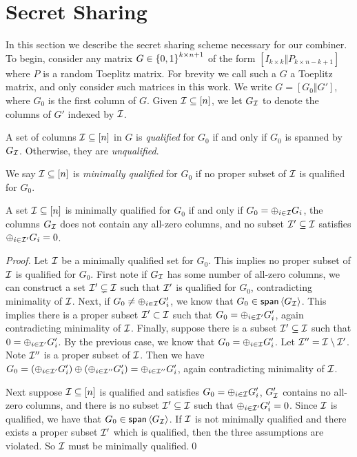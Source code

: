 \section{Secret Sharing}
In this section we describe the secret sharing scheme necessary for our combiner.
To begin, consider any matrix $G \in {\{0,1\}}^{k\times n+1}$ of the form $[I_{k\times k}\Vert P_{k\times n-k+1}]$ where $P$ is a random Toeplitz matrix.
For brevity we call such a $G$ a Toeplitz matrix, and only consider such matrices in this work.
We write $G = [G_0\Vert G']$, where $G_0$ is the first column of $G$.
Given ${\mathcal I} \subseteq [n]$, we let $G_{\mathcal I}$ to denote the columns of $G'$ indexed by ${\mathcal I}$.

\begin{definition}\label{def:qual}
	A set of columns ${\mathcal I} \subseteq [n]$ in $G$ is {\em qualified} for $G_0$ if and only if $G_0$ is spanned by $G_{\mathcal I}$.
	Otherwise, they are {\em unqualified}.
	
	We say ${\mathcal I} \subseteq [n]$ is {\em minimally qualified} for $G_0$ if no proper subset of ${\mathcal I}$ is qualified for $G_0$.
\end{definition}

\begin{lemma}\label{lem:min-qual-g}
	A set ${\mathcal I} \subseteq [n]$ is minimally qualified for $G_0$ if and only if $G_0 = \oplus_{i \in {\mathcal I}}G_i$, the columns $G_{\mathcal I}$ does not contain any all-zero columns, and no subset ${\mathcal I}' \subseteq {\mathcal I}$ satisfies $\oplus_{i \in {\mathcal I}'} G_i=0$.
\end{lemma}
\begin{proof}
	Let ${\mathcal I}$ be a minimally qualified set for $G_0$.
	This implies no proper subset of ${\mathcal I}$ is qualified for $G_0$.
	First note if $G_{\mathcal I}$ has some number of all-zero columns, we can construct a set ${\mathcal I}' \subsetneq {\mathcal I}$ such that ${\mathcal I}'$ is qualified for $G_0$, contradicting minimality of ${\mathcal I}$.
	Next, if $G_0 \neq \oplus_{i \in {\mathcal I}} G_i'$, we know that $G_0 \in \mathsf{span}\left\langle {G_\ensuremath{{\mathcal I}}} \right\rangle$.
	This implies there is a proper subset ${\mathcal I}' \subset {\mathcal I}$ such that $G_0 = \oplus_{i \in {\mathcal I}'} G_i'$, again contradicting minimality of ${\mathcal I}$.
	Finally, suppose there is a subset ${\mathcal I}' \subseteq {\mathcal I}$ such that $0 = \oplus_{i \in {\mathcal I}'} G_i'$.
	By the previous case, we know that $G_0 = \oplus_{i \in {\mathcal I}} G_i'$.
	Let ${\mathcal I}'' = {\mathcal I} \setminus {\mathcal I}'$.
	Note ${\mathcal I}''$ is a proper subset of ${\mathcal I}$.
	Then we have $G_0 = (\oplus_{i \in {\mathcal I}'} G_i') \oplus (\oplus_{i \in {\mathcal I}''} G_i') = \oplus_{i \in {\mathcal I}''} G_i'$, again contradicting minimality of ${\mathcal I}$.
	
	Next suppose ${\mathcal I} \subseteq [n]$ is qualified and satisfies $G_0 = \oplus_{i \in {\mathcal I}} G'_i$, $G'_{\mathcal I}$ contains no all-zero columns, and there is no subset ${\mathcal I}' \subseteq {\mathcal I}$ such that $\oplus_{i \in {\mathcal I}'} G_i' = 0$.
	Since ${\mathcal I}$ is qualified, we have that $G_0 \in \mathsf{span}\left\langle {G_\ensuremath{{\mathcal I}}} \right\rangle$.
	If ${\mathcal I}$ is not minimally qualified and there exists a proper subset ${\mathcal I}'$ which is qualified, then the three assumptions are violated.
	So ${\mathcal I}$ must be minimally qualified.\qed
\end{proof}

